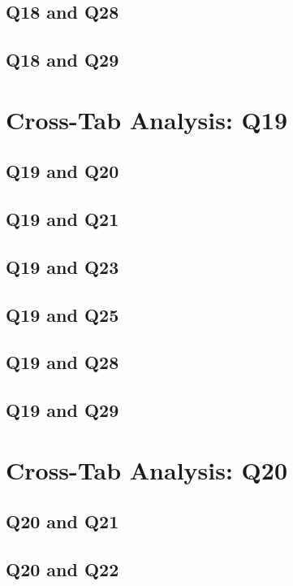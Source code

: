 \documentclass{report}
\begin{document}
\section{Q18 and Q28}\clearpage
\section{Q18 and Q29}\clearpage

\chapter{Cross-Tab Analysis: Q19}

\section{Q19 and Q20}\clearpage
\section{Q19 and Q21}\clearpage
\section{Q19 and Q23}\clearpage
\section{Q19 and Q25}\clearpage
\section{Q19 and Q28}\clearpage
\section{Q19 and Q29}\clearpage

\chapter{Cross-Tab Analysis: Q20}

\section{Q20 and Q21}\clearpage
\section{Q20 and Q22}\clearpage
\end{document}

